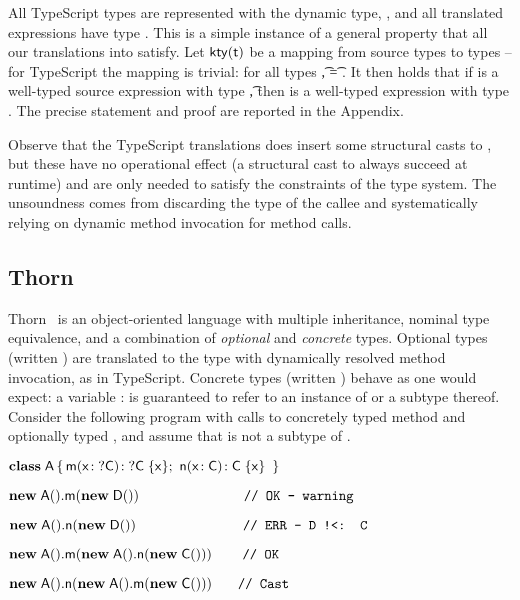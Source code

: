 \documentclass[acmlarge, anonymous, authordraft]{acmart}
\begin{document}
\noindent  All TypeScript types are represented with the dynamic \kafka type, \any, and all translated expressions have type \any.  This is a simple instance of a general property that all our translations into \kafka satisfy.  Let \(\kty\t\) be a mapping from source types to \kafka types -- for TypeScript the mapping is trivial: for all types \t, \kty\t = \src{\any}.  It then holds that if \e is a well-typed source expression with type \t, then \TR{\e} is a well-typed \kafka expression with type \kty{\t}.  The precise statement and proof are reported in the Appendix.

Observe that the TypeScript translations does insert some structural casts to \any, but these have no operational effect (a structural cast to \any always succeed at runtime) and are only needed to satisfy the constraints of the \kafka type system.  The unsoundness comes from discarding the type of the callee and systematically relying on  dynamic method invocation for method calls.


\subsection{Thorn}

Thorn~\cite{oopsla09} is an object-oriented language with multiple inheritance,
nominal type equivalence, and a combination of \emph{optional} and \emph{concrete} types.
Optional types (written \dt\C) are translated to the \any type with
dynamically resolved method invocation, as in TypeScript. Concrete types
(written \C) behave as one would expect: a variable {\x:\C} is
guaranteed to refer to an instance of \C or a subtype thereof. Consider the
following program with calls to concretely typed method \n and optionally
typed \m, and assume that \D is not a subtype of \C.

\medskip
\(
 \Class \A {
    \Mdef \m\x{\dt\C} {\dt\C}  \x  ; \ 
    \Mdef \n\x\C\C  \x 
    }
\)

\medskip
\( \Call {\New \A{}}\m {\New \D{}} \ \ \ \ \ \ \ \ \ \ \ \ \ \ \ \ \ \ \ \ \ \texttt{ // OK -- warning }\)

\( \Call {\New \A{}}\n {\New \D{} } \ \ \ \ \ \ \ \ \ \ \ \ \ \ \ \ \ \ \ \ \ \ \ \texttt{// ERR -- D !<: C} \)

\( {\sf{\bf new}}\;{\sf{A}}().{\sf{m}}( {\sf{\bf new}}\;{\sf{A}}().{\sf{n}}({\sf{\bf new}}\;{\sf{C}}()) ) \ \ \ \ \ \texttt{ // OK }\)

\( {\sf{\bf new}}\;{\sf{A}}().{\sf{n}}( {\sf{\bf new}}\;{\sf{A}}().{\sf{m}}({\sf{\bf new}}\;{\sf{C}}())) \ \ \ \ \texttt{ // Cast } \)
\end{document}
